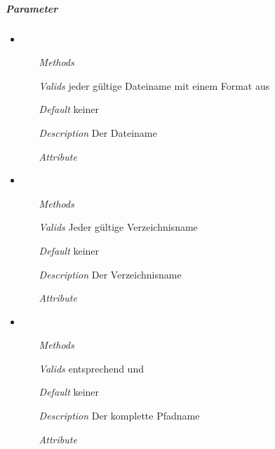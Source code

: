 \subparagraph{Parameter}
\begin{itemize}
\item {}
\begin{enumerate}
\item[\textit{Methods}] 
\item[\textit{Valids}] jeder g\"ultige Dateiname 
mit einem Format aus 
\item[\textit{Default}] keiner
\item[\textit{Description}] Der Dateiname 
\item[\textit{Attribute}] 
\end{enumerate}

\item {}
\begin{enumerate}
\item[\textit{Methods}] 
\item[\textit{Valids}] Jeder g\"ultige Verzeichnisname
\item[\textit{Default}] keiner
\item[\textit{Description}] Der Verzeichnisname
\item[\textit{Attribute}] 
\end{enumerate}

\item {}
\begin{enumerate}
\item[\textit{Methods}] 
\item[\textit{Valids}] entsprechend  und
\item[\textit{Default}] keiner
\item[\textit{Description}] Der komplette Pfadname
\item[\textit{Attribute}] 
\end{enumerate}

\end{itemize}


\newpage 

